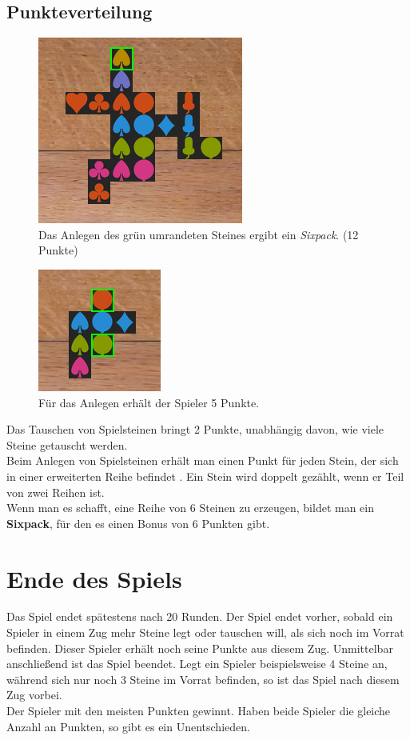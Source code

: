 \documentclass[a4paper, ngerman]{scrartcl}
\begin{document}
\subsection{Punkteverteilung}
\begin{figure}[h]
\centering
	\includegraphics[scale = 0.6]{images/sixpack_legen}
		\caption{Das Anlegen des grün umrandeten Steines ergibt ein \emph{Sixpack}. (12 Punkte)}
		\label{fig:PunkteSixpack}	
\end{figure}
\begin{figure}
	\centering	
		\includegraphics[scale = 0.7]{images/anlegen04}
		\caption{Für das Anlegen erhält der Spieler 5 Punkte.}
		\label{fig:Punkte1}	
\end{figure}
Das Tauschen von Spielsteinen bringt 2 Punkte, unabhängig davon, wie viele Steine getauscht werden.\\
Beim Anlegen von Spielsteinen erhält man einen Punkt für jeden Stein, der sich in einer erweiterten Reihe befindet . Ein Stein wird doppelt gezählt, wenn er Teil von zwei Reihen ist.\\
Wenn man es schafft, eine Reihe von 6 Steinen zu erzeugen, bildet man ein \textbf{Sixpack}, für den es einen Bonus von 6 Punkten gibt.
\newpage
	
\section{Ende des Spiels}
\label{sec:gameOver}
Das Spiel endet spätestens nach 20 Runden. Der Spiel endet vorher, sobald ein Spieler in einem Zug mehr Steine legt oder tauschen will, als sich noch im Vorrat befinden. Dieser Spieler erhält noch seine Punkte aus diesem Zug. Unmittelbar anschließend ist das Spiel beendet. Legt ein Spieler beispielsweise 4 Steine an, während sich nur noch 3 Steine im Vorrat befinden, so ist das Spiel nach diesem Zug vorbei.\\
Der Spieler mit den meisten Punkten gewinnt. Haben beide Spieler die gleiche Anzahl an Punkten, so gibt es ein Unentschieden.
\end{document}
